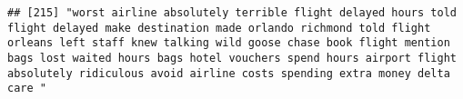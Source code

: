 \documentclass[
]{article}
\begin{document}
\begin{verbatim}
## [215] "worst airline absolutely terrible flight delayed hours told flight delayed make destination made orlando richmond told flight orleans left staff knew talking wild goose chase book flight mention bags lost waited hours bags hotel vouchers spend hours airport flight absolutely ridiculous avoid airline costs spending extra money delta care "                                                                                                                                                                                                                                                                                                                                                                                                                                                                                                                                                                                                                                                                                                                                                                                                                                                                                                                                                                                                                                                                                                                                                                                                                                                                                                                                                                                                                                           

\end{verbatim}
\end{document}
